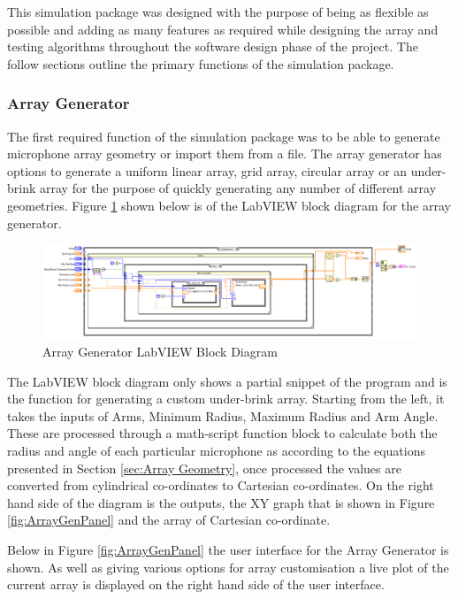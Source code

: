 \documentclass{UoNMCHA}
\numberwithin{equation}{section}
\begin{document}
    This simulation package was designed with the purpose of being as flexible as possible and adding as many features as required while designing the array and testing algorithms throughout the software design phase of the project. The follow sections outline the primary functions of the simulation package.
\subsubsection{Array Generator} \label{sec:Array Generator}
    The first required function of the simulation package was to be able to generate microphone array geometry or import them from a file. The array generator has options to generate a uniform linear array, grid array, circular array or an under-brink array for the purpose of quickly generating any number of different array geometries. Figure \ref{fig:ArrayGenBlock} shown below is of the LabVIEW block diagram for the array generator.
    
    \begin{figure}[H]
        \centering
        \includegraphics[keepaspectratio, width = \textwidth]{Figures/ArrayGenBlock.png}
        \caption{Array Generator LabVIEW Block Diagram}
        \label{fig:ArrayGenBlock}
    \end{figure}
    
    The LabVIEW block diagram only shows a partial snippet of the program and is the function for generating a custom under-brink array. Starting from the left, it takes the inputs of Arms, Minimum Radius, Maximum Radius and Arm Angle. These are processed through a math-script function block to calculate both the radius and angle of each particular microphone as according to the equations presented in Section \ref{sec:Array Geometry}, once processed the values are converted from cylindrical co-ordinates to Cartesian co-ordinates. On the right hand side of the diagram is the outputs, the XY graph that is shown in Figure \ref{fig:ArrayGenPanel} and the array of Cartesian co-ordinate.
    
    Below in Figure \ref{fig:ArrayGenPanel} the user interface for the Array Generator is shown. As well as giving various options for array customisation a live plot of the current array is displayed on the right hand side of the user interface.  
    
\end{document}
